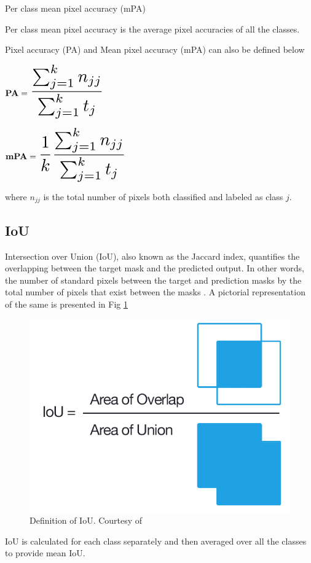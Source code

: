     
    Per class mean pixel accuracy (mPA)
    
    Per class mean pixel accuracy is the average pixel accuracies of all the classes.
    
    Pixel accuracy (PA) and Mean pixel accuracy (mPA) can also be defined below \cite{84_ulku2022survey}
    
    $
    {\bf PA } = \scalemath{2}{\frac{\sum_{j=1}^{k} n_{jj}}{\sum_{j=1}^{k} t_j} }
    $
    
    $
    {\bf mPA } = \scalemath{2}{\frac{1}{k} \frac{\sum_{j=1}^{k} n_{jj}}{\sum_{j=1}^{k} t_j}}
    $
    
    where $n_{jj}$ is the total number of pixels both classified and labeled as class $j$. 
    
    \subsection{IoU}
    
    Intersection over Union (IoU), also known as the Jaccard index, quantifies the overlapping between the target mask and the predicted output. In other words, the number of standard pixels between the target and prediction masks by the total number of pixels that exist between the masks \cite{83_iou}. A pictorial representation of the same is presented in Fig \ref{fig:IoU}
    
    \begin{figure}[h]
    	\centering
    	\includegraphics[width=12cm]{images/IoU.png}
    	\caption{Definition of IoU. Courtesy of \cite{82_iou}}
    	\label{fig:IoU}
    \end{figure}  
	
	IoU is calculated for each class separately and then averaged over all the classes to provide mean IoU.  
	
